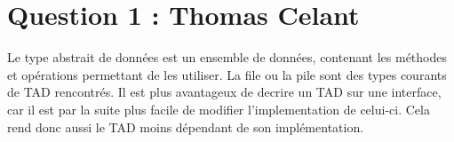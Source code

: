 \section*{Question 1 : Thomas Celant}
Le type abstrait de données est un ensemble de données, contenant les méthodes et opérations permettant de les utiliser. La file ou la pile sont des types courants de TAD rencontrés.
Il est plus avantageux de decrire un TAD sur une interface, car il est par la suite plus facile de modifier l'implementation de celui-ci. Cela rend donc aussi le TAD moins dépendant de son implémentation.
